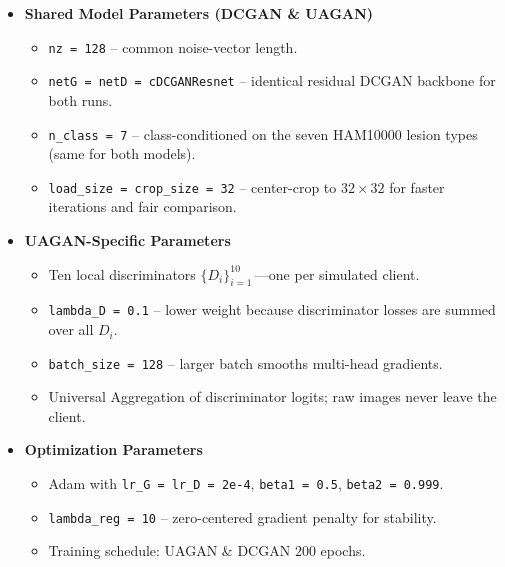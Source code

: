 \documentclass{article}
\begin{document}
\begin{itemize}
\item \textbf{Shared Model Parameters (DCGAN \& UAGAN)}
  \begin{itemize}
    \item \texttt{nz = 128} – common noise-vector length. 
    \item \texttt{netG = netD = cDCGANResnet} – identical residual DCGAN backbone for both runs. 
    \item \texttt{n\_class = 7} – class-conditioned on the seven HAM10000 lesion types (same for both models). 
    \item \texttt{load\_size = crop\_size = 32} – center-crop to \(32\times32\) for faster iterations and fair comparison.
  \end{itemize}

\item \textbf{UAGAN-Specific Parameters}
  \begin{itemize}
    \item Ten local discriminators \(\{D_i\}_{i=1}^{10}\)\,—one per simulated client. 
    \item \texttt{lambda\_D = 0.1} – lower weight because discriminator losses are summed over all \(D_i\). 
    \item \texttt{batch\_size = 128} – larger batch smooths multi-head gradients. 
    \item Universal Aggregation of discriminator logits; raw images never leave the client.
  \end{itemize}

\item \textbf{Optimization Parameters}
  \begin{itemize}
    \item Adam with \texttt{lr\_G = lr\_D = 2e-4}, \texttt{beta1 = 0.5}, \texttt{beta2 = 0.999}. 
    \item \texttt{lambda\_reg = 10} – zero-centered gradient penalty for stability. 
    \item Training schedule: UAGAN \& DCGAN \(200\) epochs.
  \end{itemize}


\end{itemize}
\end{document}

